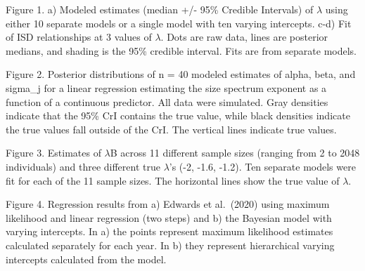 \documentclass[
  12pt,
]{article}
\begin{document}
Figure 1. a) Modeled estimates (median +/- 95\% Credible Intervals) of
\(\lambda\) using either 10 separate models or a single model with ten
varying intercepts. c-d) Fit of ISD relationships at 3 values of
\(\lambda\). Dots are raw data, lines are posterior medians, and shading
is the 95\% credible interval. Fits are from separate models.

Figure 2. Posterior distributions of n = 40 modeled estimates of alpha,
beta, and sigma\_j for a linear regression estimating the size spectrum
exponent as a function of a continuous predictor. All data were
simulated. Gray densities indicate that the 95\% CrI contains the true
value, while black densities indicate the true values fall outside of
the CrI. The vertical lines indicate true values.

Figure 3. Estimates of \(\lambda\)B across 11 different sample sizes
(ranging from 2 to 2048 individuals) and three different true
\(\lambda\)'s (-2, -1.6, -1.2). Ten separate models were fit for each of
the 11 sample sizes. The horizontal lines show the true value of
\(\lambda\).

Figure 4. Regression results from a) Edwards et al.~(2020) using maximum
likelihood and linear regression (two steps) and b) the Bayesian model
with varying intercepts. In a) the points represent maximum likelihood
estimates calculated separately for each year. In b) they represent
hierarchical varying intercepts calculated from the model.
\end{document}
